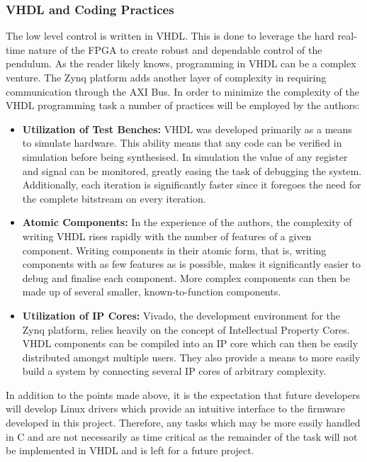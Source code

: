 \subsubsection{VHDL and Coding Practices} %
\label{ssub:vhdl_and_coding_practices}
The low level control is written in VHDL.
This is done to leverage the hard real-time nature of the FPGA to create robust and dependable control of the pendulum.
As the reader likely knows, programming in VHDL can be a complex venture.
The Zynq platform adds another layer of complexity in requiring communication through the AXI Bus.
In order to minimize the complexity of the VHDL programming task a number of practices will be employed by the authors:
\begin{itemize}
	\item \textbf{Utilization of Test Benches:} VHDL was developed primarily as a means to simulate hardware.
	This ability means that any code can be verified in simulation before being synthesised.
	In simulation the value of any register and signal can be monitored, greatly easing the task of debugging the system.
	Additionally, each iteration is significantly faster since it foregoes the need for the complete bitstream on every iteration.
	\item \textbf{Atomic Components:} In the experience of the authors, the complexity of writing VHDL rises rapidly with the number of features of a given component.
	Writing components in their atomic form, that is, writing components with as few features as is possible, makes it significantly easier to debug and finalise each component.
	More complex components can then be made up of several smaller, known-to-function components.
	\item \textbf{Utilization of IP Cores:} Vivado, the development environment for the Zynq platform, relies heavily on the concept of Intellectual Property Cores.
	VHDL components can be compiled into an IP core which can then be easily distributed amongst multiple users.
	They also provide a means to more easily build a system by connecting several IP cores of arbitrary complexity.
\end{itemize}
In addition to the points made above, it is the expectation that future developers will develop Linux drivers which provide an intuitive interface to the firmware developed in this project.
Therefore, any tasks which may be more easily handled in C and are not necessarily as time critical as the remainder of the task will not be implemented in VHDL and is left for a future project.


